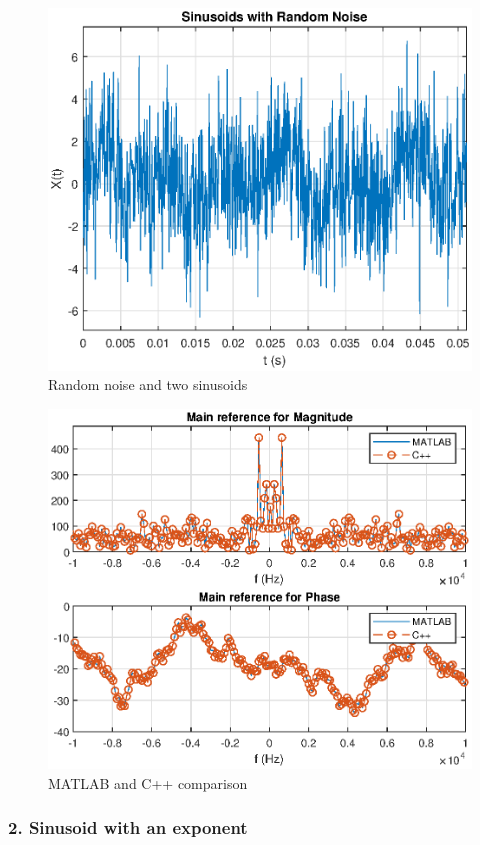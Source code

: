 \begin{refsection}
\begin{figure}[h]
	\centering
	\includegraphics[width=12cm]{./algorithms/fft/figures/random_noise.eps}
	\caption{Random noise and two sinusoids}\label{random_noise}
\end{figure}

\begin{figure}[h]
	\centering
	\includegraphics[width=12cm]{./algorithms/fft/figures/random_noise_fft.eps}
	\caption{MATLAB and C++ comparison}\label{random_noise_fft}
\end{figure}

\newpage
\subsubsection{2. Sinusoid with an exponent}


\end{refsection}
